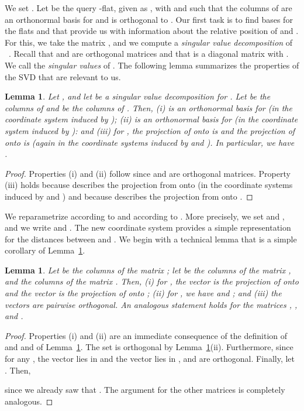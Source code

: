 \documentclass[a4paper,11pt]{paper}
\newtheorem{lemma}[theorem]{Lemma}
\begin{document}
We set .
Let  be the query -flat, given as ,
with  and  such
that the columns of  are an orthonormal basis for 
and  is orthogonal to . Our first task is to find bases
for the flats  and  that provide us
with information about the relative position of  and .
For this, we take the matrix
, and we compute a \emph{singular
value decomposition}  of ~\cite[Chapter~7.3]{HornJo13}.
Recall that  and  are orthogonal  matrices and
that 
is a  diagonal matrix
with .
We call  the \emph{singular values}
of . The following lemma summarizes the properties of
the SVD that are relevant to us.
\begin{lemma}\label{lem:svd}
  Let , and let  be a singular
  value decomposition for . Let  be
  the columns of  and  be the columns of .
  Then,
  (i)  is an orthonormal basis
  for  (in the coordinate system induced by );
  (ii)  is an orthonormal basis for 
  (in the coordinate system induced by ): and
  (iii) for , the projection of  onto
   is  and the projection of  onto
   is  (again in the coordinate systems
  induced by  and ).
  In particular, we have .
\end{lemma}
\begin{proof}
  Properties (i) and (ii) follow since  and 
  are orthogonal matrices.
  Property (iii) holds because  describes the projection
  from  onto  (in the coordinate systems induced by  and
  ) and because  describes the
  projection from  onto .
\end{proof}

We reparametrize  according to  and  according to .
More precisely, we set  and , and we write
 and .
The new coordinate system provides
a simple representation for the distances between  and .
We begin with a technical lemma that is a simple corollary of
Lemma~\ref{lem:svd}.
\begin{lemma}\label{lem:matrices}
  Let  be the columns of the matrix ;
  let  be the columns of
  the matrix , and  the
  columns of the matrix .
  Then, (i) for , the vector  is
  the projection of  onto  and the vector 
  is the projection of  onto ;
  (ii) for , we have
   and
   ; and
  (iii) the vectors  are pairwise orthogonal.
  An analogous statement holds for the matrices
  , , and .
\end{lemma}
\begin{proof}
  Properties (i) and (ii) are an immediate consequence of the
  definition of  and  and of Lemma~\ref{lem:svd}.
  The set  is orthogonal
  by Lemma~\ref{lem:svd}(ii). Furthermore, since for any
  , the vector
   lies in  and the vector
   lies in ,
   and  are orthogonal.
  Finally, let . Then,
  
  since we already saw that
  .
  The argument for the other matrices is
  completely analogous.
\end{proof}
\end{document}
